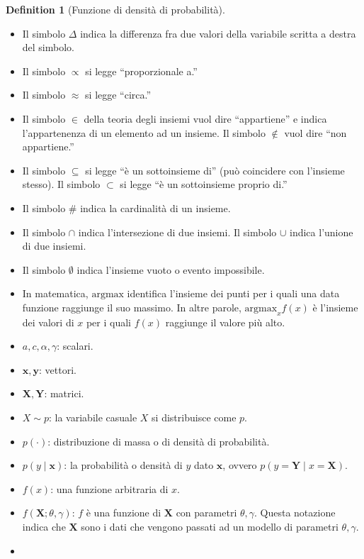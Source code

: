 \documentclass[
  letterpaper,
  DIV=11,
  numbers=noendperiod,
  oneside]{scrreprt}
\theoremstyle{definition}
\theoremstyle{plain}
\theoremstyle{definition}
\newtheorem{definition}{Definition}[chapter]
\theoremstyle{remark}
\begin{document}
\begin{definition}[Funzione di densità di
probabilità]
\begin{itemize}
  definizione.''
\item
  Il simbolo \(\Delta\) indica la differenza fra due valori della
  variabile scritta a destra del simbolo.
\item
  Il simbolo \(\propto\) si legge ``proporzionale a.''
\item
  Il simbolo \(\approx\) si legge ``circa.''
\item
  Il simbolo \(\in\) della teoria degli insiemi vuol dire ``appartiene''
  e indica l'appartenenza di un elemento ad un insieme. Il simbolo
  \(\notin\) vuol dire ``non appartiene.''
\item
  Il simbolo \(\subseteq\) si legge ``è un sottoinsieme di'' (può
  coincidere con l'insieme stesso). Il simbolo \(\subset\) si legge ``è
  un sottoinsieme proprio di.''
\item
  Il simbolo \(\#\) indica la cardinalità di un insieme.
\item
  Il simbolo \(\cap\) indica l'intersezione di due insiemi. Il simbolo
  \(\cup\) indica l'unione di due insiemi.
\item
  Il simbolo \(\emptyset\) indica l'insieme vuoto o evento impossibile.
\item
  In matematica, \(\mbox{argmax}\) identifica l'insieme dei punti per i
  quali una data funzione raggiunge il suo massimo. In altre parole,
  \(\mbox{argmax}_x f(x)\) è l'insieme dei valori di \(x\) per i quali
  \(f(x)\) raggiunge il valore più alto.
\item
  \(a, c, \alpha, \gamma\): scalari.
\item
  \(\boldsymbol{x}, \boldsymbol{y}\): vettori.
\item
  \(\boldsymbol{X}, \boldsymbol{Y}\): matrici.
\item
  \(X \sim p\): la variabile casuale \(X\) si distribuisce come \(p\).
\item
  \(p(\cdot)\): distribuzione di massa o di densità di probabilità.
\item
  \(p(y \mid \boldsymbol{x})\): la probabilità o densità di \(y\) dato
  \(\boldsymbol{x}\), ovvero
  \(p(y = \boldsymbol{Y} \mid x = \boldsymbol{X})\).
\item
  \(f(x)\): una funzione arbitraria di \(x\).
\item
  \(f(\boldsymbol{X}; \theta, \gamma)\): \(f\) è una funzione di
  \(\boldsymbol{X}\) con parametri \(\theta, \gamma\). Questa notazione
  indica che \(\boldsymbol{X}\) sono i dati che vengono passati ad un
  modello di parametri \(\theta, \gamma\).
\item

\end{itemize}
\end{definition}
\end{document}
